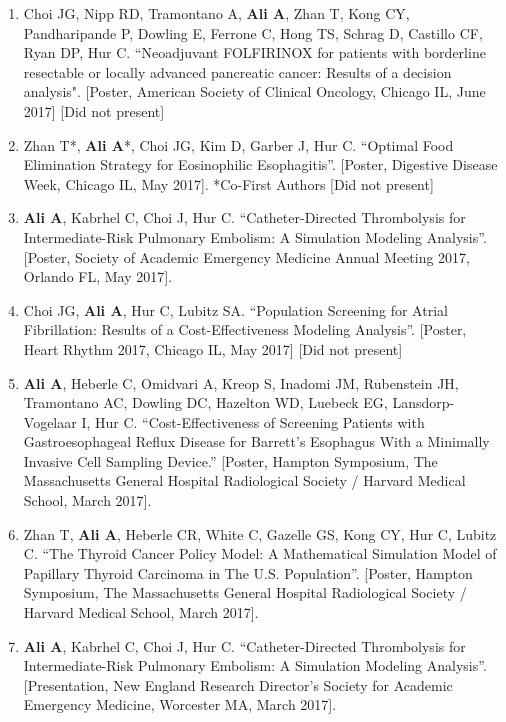 \documentclass{article}
\newcommand{\nl}{\noindent \normalsize}
\begin{document}
\begin{enumerate}
		\item \nl Choi JG, Nipp RD, Tramontano A, \textbf{Ali A}, Zhan T, Kong CY, Pandharipande P, Dowling E, Ferrone C, Hong TS, Schrag D, Castillo CF, Ryan DP, Hur C. ``Neoadjuvant FOLFIRINOX for patients with borderline resectable or locally advanced pancreatic cancer: Results of a decision analysis". [Poster, American Society of Clinical Oncology, Chicago IL, June 2017] [Did not present]
		
		\item Zhan T*, \textbf{Ali A}*,  Choi JG, Kim D, Garber J, Hur C. ``Optimal Food Elimination Strategy for Eosinophilic Esophagitis''. [Poster, Digestive Disease Week, Chicago IL, May 2017]. *Co-First Authors [Did not present]
	
		\item \textbf{Ali A}, Kabrhel C, Choi J, Hur C. ``Catheter-Directed Thrombolysis for Intermediate-Risk Pulmonary Embolism: A Simulation Modeling Analysis''. [Poster, Society of Academic Emergency Medicine Annual Meeting 2017,  Orlando FL, May 2017].
	
		\item Choi JG, \textbf{Ali A}, Hur C, Lubitz SA. ``Population Screening for Atrial Fibrillation: Results of a Cost-Effectiveness Modeling Analysis''. [Poster, Heart Rhythm 2017, Chicago IL, May 2017] [Did not present]
	
		\item \textbf{Ali A}, Heberle C, Omidvari A, Kreop S, Inadomi JM, Rubenstein JH, Tramontano AC, Dowling DC, Hazelton WD, Luebeck EG, Lansdorp-Vogelaar I, Hur C.  ``Cost-Effectiveness of Screening Patients with Gastroesophageal Reflux Disease for Barrett's Esophagus With a Minimally Invasive Cell Sampling Device.'' [Poster, Hampton Symposium, The Massachusetts General Hospital Radiological Society / Harvard Medical School, March 2017].
		
		\item Zhan T, \textbf{Ali A}, Heberle CR, White C, Gazelle GS, Kong CY, Hur C, Lubitz C. ``The Thyroid Cancer Policy Model: A Mathematical Simulation Model of Papillary Thyroid Carcinoma in The U.S. Population''. [Poster, Hampton Symposium, The Massachusetts General Hospital Radiological Society / Harvard Medical School, March 2017].
		
		\item \textbf{Ali A}, Kabrhel C, Choi J, Hur C. ``Catheter-Directed Thrombolysis for Intermediate-Risk Pulmonary Embolism: A Simulation Modeling Analysis''.  [Presentation, New England Research Director's Society for Academic Emergency Medicine, Worcester MA, March 2017].
	
	\end{enumerate}
\end{document}
